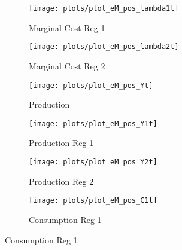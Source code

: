 \documentclass[../thesis.tex]{subfiles}
\begin{document}
\begin{figure}[h!]
		\begin{subfigure}[b]{0.26\textwidth}
			\centering
			\texttt{[image: plots/plot\_eM\_pos\_lambda1t]}
			\caption{\footnotesize Marginal Cost Reg 1}
			\label{fig:ZMt-lambda1t}
		\end{subfigure}
		\hfill
		\begin{subfigure}[b]{0.26\textwidth}
			\centering
			\texttt{[image: plots/plot\_eM\_pos\_lambda2t]}
			\caption{\footnotesize Marginal Cost Reg 2}
			\label{fig:ZMt-lambda2t}
		\end{subfigure}
		\hfill
		\begin{subfigure}[b]{0.26\textwidth}
			\centering
			\texttt{[image: plots/plot\_eM\_pos\_Yt]}
			\caption{\footnotesize Production}
			\label{fig:ZMt-Yt}
		\end{subfigure}
		\hfill		
		\vspace*{0.5cm}

	
		\begin{subfigure}[b]{0.26\textwidth}
			\centering
			\texttt{[image: plots/plot\_eM\_pos\_Y1t]}
			\caption{\footnotesize Production Reg 1}
			\label{fig:ZMt-Y1t}
		\end{subfigure}
		\hfill
		\begin{subfigure}[b]{0.26\textwidth}
			\centering
			\texttt{[image: plots/plot\_eM\_pos\_Y2t]}
			\caption{\footnotesize Production Reg 2}
			\label{fig:ZMt-Y2t}
		\end{subfigure}
		\hfill
		\begin{subfigure}[b]{0.26\textwidth}
			\centering
			\texttt{[image: plots/plot\_eM\_pos\_C1t]}
			\caption{\footnotesize Consumption Reg 1}
			\label{fig:ZMt-C1t}
		\end{subfigure}
		\hfill
		\vspace*{0.5cm}
		


\end{figure}
\end{document}

